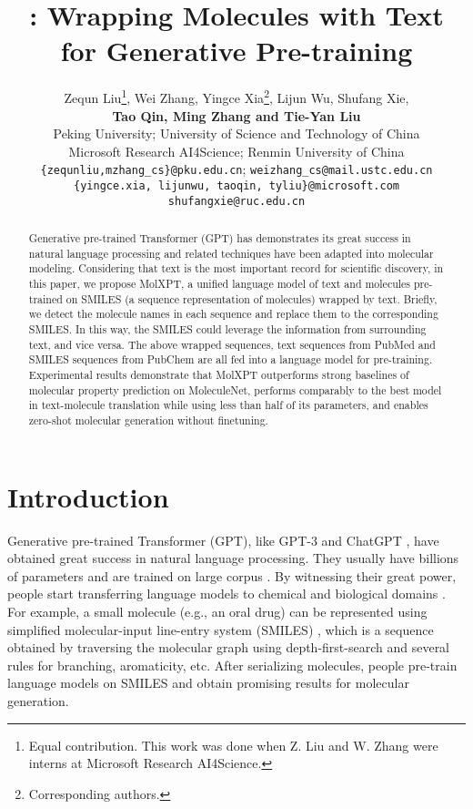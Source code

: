 \documentclass[11pt]{article}
\title{\ourM{}: Wrapping Molecules with Text for Generative Pre-training}
\author{Zequn Liu\thanks{Equal contribution. This work was done when Z. Liu and W. Zhang were interns at Microsoft Research AI4Science.}, Wei Zhang, Yingce Xia\thanks{Corresponding authors.}\;, Lijun Wu, Shufang Xie, \\\textbf{Tao Qin, Ming Zhang and Tie-Yan Liu}\\
 Peking University;  University of Science and Technology of China \\
 Microsoft Research AI4Science;  Renmin University of China\\
   \texttt{\{zequnliu,mzhang\_cs\}@pku.edu.cn}; 
  \texttt{weizhang\_cs@mail.ustc.edu.cn} \\
  \texttt{\{yingce.xia, lijunwu, taoqin, tyliu\}@microsoft.com}\\
  \texttt{shufangxie@ruc.edu.cn}}
\newcommand{\ourM}{MolXPT}
\begin{document}
\maketitle
\begin{abstract}
Generative pre-trained Transformer (GPT) has demonstrates its great success in natural language processing and related techniques have been adapted into molecular modeling. Considering that text is the most important record for scientific discovery, in this paper, we propose \ourM{}, a unified language model of text and molecules pre-trained on SMILES (a sequence representation of molecules) wrapped by text. Briefly, we detect the molecule names in each sequence and replace them to the corresponding SMILES. In this way, the SMILES could leverage the information from surrounding text, and vice versa. The above wrapped sequences,  text sequences from PubMed and  SMILES sequences from PubChem are all fed into a language model for pre-training. 
Experimental results demonstrate that \ourM{} outperforms strong baselines of molecular property prediction  on MoleculeNet, performs comparably to the best model in text-molecule translation while using less than half of its parameters, and enables zero-shot molecular generation without finetuning. 
\end{abstract}

\section{Introduction}
Generative pre-trained Transformer (GPT), like GPT-3 \citep{GPT3} and ChatGPT \citep{chatGPT}, have obtained great success in natural language processing. They usually have billions of parameters and are trained on large corpus \cite{taylor2022galactica,singhal2022large}. By witnessing their great power, people start transferring language models to chemical \citep{MolGPT} and biological domains \citep{protGPT2}. For example, a small molecule (e.g., an oral drug) can be represented using simplified molecular-input line-entry system (SMILES) \cite{smiles}, which is a sequence obtained by traversing the molecular graph using depth-first-search and several rules for branching, aromaticity, etc. After serializing molecules, people pre-train language models on SMILES \citep{MolGPT,tong2021generative,neuralScale} and obtain promising results for molecular generation.
\end{document}
